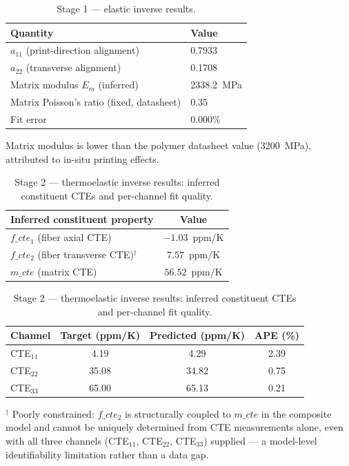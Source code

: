 \documentclass[preprint,review,10pt,number]{elsarticle}
\begin{document}
\begin{table}[h]
\centering
\caption{Stage 1 --- elastic inverse results.}
\label{tab:app_staged_elastic}
\begin{tabular}{ll}
\toprule
\textbf{Quantity} & \textbf{Value} \\
\midrule
$a_{11}$ (print-direction alignment) & 0.7933 \\
$a_{22}$ (transverse alignment) & 0.1708 \\
Matrix modulus $E_m$ (inferred) & 2338.2~MPa \\
Matrix Poisson's ratio (fixed, datasheet) & 0.35 \\
Fit error & 0.000\% \\
\bottomrule
\end{tabular}

\vspace{4pt}
\footnotesize Matrix modulus is lower than the polymer datasheet value (3200~MPa), attributed to in-situ printing effects.
\end{table}

\begin{table}[h]
\centering
\caption{Stage 2 --- thermoelastic inverse results: inferred constituent CTEs and per-channel fit quality.}
\label{tab:app_staged_thermoelastic}
\begin{tabular}{lc}
\toprule
\textbf{Inferred constituent property} & \textbf{Value} \\
\midrule
$f\_cte_1$ (fiber axial CTE) & $-1.03$~ppm/K \\
$f\_cte_2$ (fiber transverse CTE)$^\dagger$ & $7.57$~ppm/K \\
$m\_cte$ (matrix CTE) & $56.52$~ppm/K \\
\bottomrule
\end{tabular}

\vspace{6pt}
\begin{tabular}{lccc}
\toprule
\textbf{Channel} & \textbf{Target (ppm/K)} & \textbf{Predicted (ppm/K)} & \textbf{APE (\%)} \\
\midrule
CTE$_{11}$ & 4.19  & 4.29  & 2.39 \\
CTE$_{22}$ & 35.08 & 34.82 & 0.75 \\
CTE$_{33}$ & 65.00 & 65.13 & 0.21 \\
\bottomrule
\end{tabular}

\vspace{4pt}
\footnotesize $^\dagger$ Poorly constrained: $f\_cte_2$ is structurally coupled to $m\_cte$ in the composite model and cannot be uniquely determined from CTE measurements alone, even with all three channels (CTE$_{11}$, CTE$_{22}$, CTE$_{33}$) supplied --- a model-level identifiability limitation rather than a data gap.
\end{table}
\end{document}
